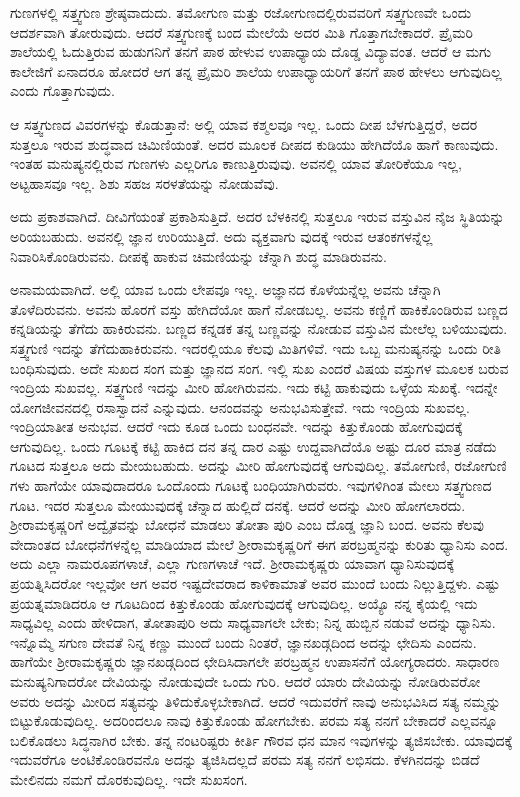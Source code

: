 ಗುಣಗಳಲ್ಲಿ ಸತ್ತ್ವಗುಣ ಶ್ರೇಷ್ಠವಾದುದು. ತಮೋಗುಣ ಮತ್ತು ರಜೋಗುಣದಲ್ಲಿರುವವರಿಗೆ ಸತ್ತ್ವಗುಣವೇ ಒಂದು ಆದರ್ಶವಾಗಿ ತೋರುವುದು. ಆದರೆ ಸತ್ತ್ವಗುಣಕ್ಕೆ ಬಂದ ಮೇಲೆಯೆ ಅದರ ಮಿತಿ ಗೊತ್ತಾಗಬೇಕಾದರೆ. ಪ್ರೈಮರಿ ಶಾಲೆಯಲ್ಲಿ ಓದುತ್ತಿರುವ ಹುಡುಗನಿಗೆ ತನಗೆ ಪಾಠ ಹೇಳುವ ಉಪಾಧ್ಯಾಯ ದೊಡ್ಡ ವಿದ್ಯಾವಂತ. ಆದರೆ ಆ ಮಗು ಕಾಲೇಜಿಗೆ ಏನಾದರೂ ಹೋದರೆ ಆಗ ತನ್ನ ಪ್ರೈಮರಿ ಶಾಲೆಯ ಉಪಾಧ್ಯಾಯರಿಗೆ ತನಗೆ ಪಾಠ ಹೇಳಲು ಆಗುವುದಿಲ್ಲ ಎಂದು ಗೊತ್ತಾಗುವುದು.

ಆ ಸತ್ತ್ವಗುಣದ ವಿವರಗಳನ್ನು ಕೊಡುತ್ತಾನೆ: ಅಲ್ಲಿ ಯಾವ ಕಶ್ಮಲವೂ ಇಲ್ಲ. ಒಂದು ದೀಪ ಬೆಳಗುತ್ತಿದ್ದರೆ, ಅದರ ಸುತ್ತಲೂ ಇರುವ ಶುದ್ಧವಾದ ಚಿಮಿಣಿಯಂತೆ. ಅದರ ಮೂಲಕ ದೀಪದ ಕುಡಿಯು ಹೇಗಿದೆಯೊ ಹಾಗೆ ಕಾಣುವುದು. ಇಂತಹ ಮನುಷ್ಯನಲ್ಲಿರುವ ಗುಣಗಳು ಎಲ್ಲರಿಗೂ ಕಾಣುತ್ತಿರುವುವು. ಅವನಲ್ಲಿ ಯಾವ ತೋರಿಕೆಯೂ ಇಲ್ಲ, ಅಟ್ಟಹಾಸವೂ ಇಲ್ಲ. ಶಿಶು ಸಹಜ ಸರಳತೆಯನ್ನು ನೋಡುವೆವು.

ಅದು ಪ್ರಕಾಶವಾಗಿದೆ. ದೀವಿಗೆಯಂತೆ ಪ್ರಕಾಶಿಸುತ್ತಿದೆ. ಅದರ ಬೆಳಕಿನಲ್ಲಿ ಸುತ್ತಲೂ ಇರುವ ವಸ್ತುವಿನ ನೈಜ ಸ್ಥಿತಿಯನ್ನು ಅರಿಯಬಹುದು. ಅವನಲ್ಲಿ ಜ್ಞಾನ ಉರಿಯುತ್ತಿದೆ. ಅದು ವ್ಯಕ್ತವಾಗು ವುದಕ್ಕೆ ಇರುವ ಆತಂಕಗಳನ್ನೆಲ್ಲ ನಿವಾರಿಸಿಕೊಂಡಿರುವನು. ದೀಪಕ್ಕೆ ಹಾಕುವ ಚಿಮಣಿಯನ್ನು ಚೆನ್ನಾಗಿ ಶುದ್ಧ ಮಾಡಿರುವನು.

ಅನಾಮಯವಾಗಿದೆ. ಅಲ್ಲಿ ಯಾವ ಒಂದು ಲೇಪವೂ ಇಲ್ಲ. ಅಜ್ಞಾನದ ಕೊಳೆಯನ್ನೆಲ್ಲ ಅವನು ಚೆನ್ನಾಗಿ ತೊಳೆದಿರುವನು. ಅವನು ಹೊರಗೆ ವಸ್ತು ಹೇಗಿದೆಯೋ ಹಾಗೆ ನೋಡಬಲ್ಲ. ಅವನು ಕಣ್ಣಿಗೆ ಹಾಕಿಕೊಂಡಿರುವ ಬಣ್ಣದ ಕನ್ನಡಿಯನ್ನು ತೆಗೆದು ಹಾಕಿರುವನು. ಬಣ್ಣದ ಕನ್ನಡಕ ತನ್ನ ಬಣ್ಣವನ್ನು ನೋಡುವ ವಸ್ತುವಿನ ಮೇಲೆಲ್ಲ ಬಳಿಯುವುದು. ಸತ್ತ್ವಗುಣಿ ಇದನ್ನು ತೆಗೆದುಹಾಕಿರುವನು. ಇದರಲ್ಲಿಯೂ ಕೆಲವು ಮಿತಿಗಳಿವೆ. ಇದು ಒಬ್ಬ ಮನುಷ್ಯನನ್ನು ಒಂದು ರೀತಿ ಬಂಧಿಸುವುದು. ಅದೇ ಸುಖದ ಸಂಗ ಮತ್ತು ಜ್ಞಾನದ ಸಂಗ. ಇಲ್ಲಿ ಸುಖ ಎಂದರೆ ವಿಷಯ ವಸ್ತುಗಳ ಮೂಲಕ ಬರುವ ಇಂದ್ರಿಯ ಸುಖವಲ್ಲ. ಸತ್ತ್ವಗುಣಿ ಇದನ್ನು ಮೀರಿ ಹೋಗಿರುವನು. ಇದು ಕಟ್ಟಿ ಹಾಕುವುದು ಒಳ್ಳೆಯ ಸುಖಕ್ಕೆ. ಇದನ್ನೇ ಯೋಗಜೀವನದಲ್ಲಿ ರಸಾಸ್ವಾದನೆ ಎನ್ನುವುದು. ಆನಂದವನ್ನು ಅನುಭವಿಸುತ್ತೇವೆ. ಇದು ಇಂದ್ರಿಯ ಸುಖವಲ್ಲ. ಇಂದ್ರಿಯಾತೀತ ಅನುಭವ. ಆದರೆ ಇದು ಕೂಡ ಒಂದು ಬಂಧನವೇ. ಇದನ್ನು ಕಿತ್ತುಕೊಂಡು ಹೋಗುವುದಕ್ಕೆ ಆಗುವುದಿಲ್ಲ. ಒಂದು ಗೂಟಕ್ಕೆ ಕಟ್ಟಿ ಹಾಕಿದ ದನ ತನ್ನ ದಾರ ಎಷ್ಟು ಉದ್ದವಾಗಿದೆಯೊ ಅಷ್ಟು ದೂರ ಮಾತ್ರ ನಡೆದು ಗೂಟದ ಸುತ್ತಲೂ ಅದು ಮೇಯಬಹುದು. ಅದನ್ನು ಮೀರಿ ಹೋಗುವುದಕ್ಕೆ ಆಗುವುದಿಲ್ಲ. ತಮೋಗುಣಿ, ರಜೋಗುಣಿ ಗಳು ಹಾಗೆಯೇ ಯಾವುದಾದರೂ ಒಂದೊಂದು ಗೂಟಕ್ಕೆ ಬಂಧಿಯಾಗಿರುವರು. ಇವುಗಳಿಗಿಂತ ಮೇಲು ಸತ್ತ್ವಗುಣದ ಗೂಟ. ಇದರ ಸುತ್ತಲೂ ಮೇಯುವುದಕ್ಕೆ ಚೆನ್ನಾದ ಹುಲ್ಲಿದೆ ದನಕ್ಕೆ. ಆದರೆ ಅದನ್ನು ಮೀರಿ ಹೋಗಲಾರದು. ಶ‍್ರೀರಾಮಕೃಷ್ಣರಿಗೆ ಅದ್ವೈತವನ್ನು ಬೋಧನೆ ಮಾಡಲು ತೋತಾ ಪುರಿ ಎಂಬ ದೊಡ್ಡ ಜ್ಞಾನಿ ಬಂದ. ಅವನು ಕೆಲವು ವೇದಾಂತದ ಬೋಧನೆಗಳನ್ನೆಲ್ಲ ಮಾಡಿಯಾದ ಮೇಲೆ ಶ‍್ರೀರಾಮಕೃಷ್ಣರಿಗೆ ಈಗ ಪರಬ್ರಹ್ಮನನ್ನು ಕುರಿತು ಧ್ಯಾನಿಸು ಎಂದ. ಅದು ಎಲ್ಲಾ ನಾಮರೂಪಗಳಾಚೆ, ಎಲ್ಲಾ ಗುಣಗಳಾಚೆ ಇದೆ. ಶ‍್ರೀರಾಮಕೃಷ್ಣರು ಯಾವಾಗ ಧ್ಯಾನಿಸುವುದಕ್ಕೆ ಪ್ರಯತ್ನಿಸಿದರೋ ಇಲ್ಲವೋ ಆಗ ಅವರ ಇಷ್ಟದೇವರಾದ ಕಾಳಿಕಾಮಾತೆ ಅವರ ಮುಂದೆ ಬಂದು ನಿಲ್ಲುತ್ತಿದ್ದಳು. ಎಷ್ಟು ಪ್ರಯತ್ನಮಾಡಿದರೂ ಆ ಗೂಟದಿಂದ ಕಿತ್ತುಕೊಂಡು ಹೋಗುವುದಕ್ಕೆ ಆಗುವುದಿಲ್ಲ. ಅಯ್ಯೊ ನನ್ನ ಕೈಯಲ್ಲಿ ಇದು ಸಾಧ್ಯವಿಲ್ಲ ಎಂದು ಹೇಳಿದಾಗ, ತೋತಾಪುರಿ ಅದು ಸಾಧ್ಯವಾಗಲೇ ಬೇಕು; ನಿನ್ನ ಹುಬ್ಬಿನ ನಡುವೆ ಅದನ್ನು ಧ್ಯಾನಿಸು. ಇನ್ನೊಮ್ಮೆ ಸಗುಣ ದೇವತೆ ನಿನ್ನ ಕಣ್ಣು ಮುಂದೆ ಬಂದು ನಿಂತರೆ, ಜ್ಞಾನಖಡ್ಗದಿಂದ ಅದನ್ನು ಛೇದಿಸು ಎಂದನು. ಹಾಗೆಯೇ ಶ‍್ರೀರಾಮಕೃಷ್ಣರು ಜ್ಞಾನಖಡ್ಗದಿಂದ ಛೇದಿಸಿದಾಗಲೇ ಪರಬ್ರಹ್ಮನ ಉಪಾಸನೆಗೆ ಯೋಗ್ಯರಾದರು. ಸಾಧಾರಣ ಮನುಷ್ಯನಿಗಾದರೋ ದೇವಿಯನ್ನು ನೋಡುವುದೇ ಒಂದು ಗುರಿ. ಆದರೆ ಯಾರು ದೇವಿಯನ್ನು ನೋಡಿರುವರೋ ಅವರು ಅದನ್ನು ಮೀರಿದ ಸತ್ಯವನ್ನು ತಿಳಿದುಕೊಳ್ಳಬೇಕಾಗಿದೆ. ಆದರೆ ಇದುವರೆಗೆ ನಾವು ಅನುಭವಿಸಿದ ಸತ್ಯ ನಮ್ಮನ್ನು ಬಿಟ್ಟುಕೊಡುವುದಿಲ್ಲ. ಅದರಿಂದಲೂ ನಾವು ಕಿತ್ತುಕೊಂಡು ಹೋಗಬೇಕು. ಪರಮ ಸತ್ಯ ನನಗೆ ಬೇಕಾದರೆ ಎಲ್ಲವನ್ನೂ ಬಲಿಕೊಡಲು ಸಿದ್ಧನಾಗಿರ ಬೇಕು. ತನ್ನ ನಂಟರಿಷ್ಟರು ಕೀರ್ತಿ ಗೌರವ ಧನ ಮಾನ ಇವುಗಳನ್ನು ತ್ಯಜಿಸಬೇಕು. ಯಾವುದಕ್ಕೆ ಇದುವರೆಗೂ ಅಂಟಿಕೊಂಡಿರವನೊ ಅದನ್ನು ತ್ಯಜಿಸಿದಲ್ಲದೆ ಪರಮ ಸತ್ಯ ನನಗೆ ಲಭಿಸದು. ಕೆಳಗಿನದನ್ನು ಬಿಡದೆ ಮೇಲಿನದು ನಮಗೆ ದೊರಕುವುದಿಲ್ಲ. ಇದೇ ಸುಖಸಂಗ.

